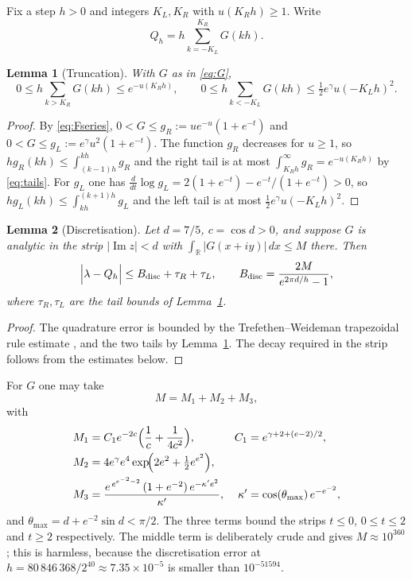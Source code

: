 \documentclass[11pt,a4paper]{article}
\newtheorem{lemma}{Lemma}
\theoremstyle{remark}
\newcommand{\lam}{\lambda}
\newcommand{\R}{\mathbb{R}}
\begin{document}
Fix a step $h>0$ and integers $K_L,K_R$ with $u(K_Rh)\ge1$. Write
\begin{equation}
  Q_h=h\sum_{k=-K_L}^{K_R}G(kh).
\end{equation}

\begin{lemma}[Truncation]
\label{lem:tail}
With $G$ as in \eqref{eq:G},
\begin{equation}
  0\le h\!\!\sum_{k>K_R}\!G(kh)\le e^{-u(K_Rh)},\qquad
  0\le h\!\!\sum_{k<-K_L}\!G(kh)\le \tfrac12 e^{\gamma}u(-K_Lh)^2 .
\end{equation}
\end{lemma}

\begin{proof}
By \eqref{eq:Fseries}, $0<G\le g_R:=ue^{-u}(1+e^{-t})$ and
$0<G\le g_L:=e^\gamma u^2(1+e^{-t})$. The function $g_R$ decreases for
$u\ge1$, so $hg_R(kh)\le\int_{(k-1)h}^{kh}g_R$ and the right tail is at
most $\int_{K_Rh}^\infty g_R=e^{-u(K_Rh)}$ by \eqref{eq:tails}. For
$g_L$ one has $\frac{d}{dt}\log g_L=2(1+e^{-t})-e^{-t}/(1+e^{-t})>0$, so
$hg_L(kh)\le\int_{kh}^{(k+1)h}g_L$ and the left tail is at most
$\frac12e^\gamma u(-K_Lh)^2$.
\end{proof}

\begin{lemma}[Discretisation]
\label{lem:disc}
Let $d=7/5$, $c=\cos d>0$, and suppose $G$ is analytic in the strip
$|\operatorname{Im}z|<d$ with
$\int_\R|G(x+iy)|\,dx\le M$ there. Then
\begin{equation}
  \Bigl|\lam-Q_h\Bigr|
  \le B_{\mathrm{disc}}+\tau_R+\tau_L,
  \qquad
  B_{\mathrm{disc}}=\frac{2M}{e^{2\pi d/h}-1},
\end{equation}
where $\tau_R,\tau_L$ are the tail bounds of Lemma~\ref{lem:tail}.
\end{lemma}

\begin{proof}
The quadrature error is bounded by the Trefethen--Weideman trapezoidal
rule estimate \cite[Thm.~5.1]{TW2014}, and the two tails by
Lemma~\ref{lem:tail}. The decay required in the strip follows from the
estimates below.
\end{proof}

For $G$ one may take
\begin{equation}
  M=M_1+M_2+M_3,
  \label{eq:M}
\end{equation}
with
\begin{align}
  M_1&=C_1e^{-2c}\Bigl(\frac1c+\frac1{4c^2}\Bigr),
  &C_1&=e^{\gamma+2+(e-2)/2},\\
  M_2&=4e^{\gamma}e^{4}\exp\!\Bigl(2e^2+\tfrac12e^{e^2}\Bigr),\\
  M_3&=\frac{e^{\,e^{e^{-2}-2}}\,(1+e^{-2})\,e^{-\kappa'e^2}}{\kappa'},
  &\kappa'&=\cos(\theta_{\max})\,e^{-e^{-2}},
\end{align}
and $\theta_{\max}=d+e^{-2}\sin d<\pi/2$. The three terms bound the
strips $t\le0$, $0\le t\le2$ and $t\ge2$ respectively. The middle term
is deliberately crude and gives $M\approx10^{360}$; this is harmless,
because the discretisation error at
$h=80\,846\,368/2^{40}\approx7.35\times10^{-5}$ is smaller than
$10^{-51594}$.
\end{document}
